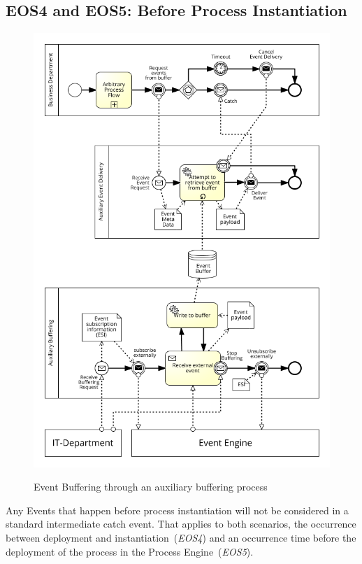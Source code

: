 \subsection*{EOS4 and EOS5: Before Process Instantiation}\label{ass:model:buffered}
\begin{figure}[]
	\myfloatalign
	{\hspace*{-0.0cm}\includegraphics[width=1.2\linewidth]{chapters/assessment/EOS5_buffer_pushing.png}}
	\caption{Event Buffering through an auxiliary buffering process}\label{fig:aux-buffering-process}
\end{figure}

Any Events that happen before process instantiation will not be considered in a standard intermediate catch event. That applies to both scenarios, the occurrence between deployment and instantiation~(\textit{EOS4}) and an occurrence time before the deployment of the process in the Process Engine~(\textit{EOS5}).


